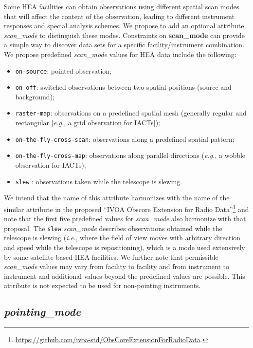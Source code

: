 \documentclass[11pt,a4paper]{ivoa}
\begin{document}
Some \gls{HEA} facilities can obtain observations using different spatial scan modes that will affect the content of the observation, leading to different instrument responses and special analysis schemes.  We propose to add an optional attribute {\em scan\_mode\/} to distinguish these modes.  Constraints on {\bf scan\_mode} can provide a simple way to discover data sets for a specific facility/instrument combination.  We propose predefined {\em scan\_mode\/} values for \gls{HEA} data include the following:
\begin{itemize}
	\item \texttt{on-source}: pointed observation;
	\item \texttt{on-off}: switched observations between two spatial positions (source and background);
	\item \texttt{raster-map}: observations on a predefined spatial mesh (generally regular and rectangular [{\em e.g.\/}, a grid observation for \glspl{IACT}]);
	\item \texttt{on-the-fly-cross-scan}: observations along a predefined spatial pattern;
	\item \texttt{on-the-fly-cross-map}: observations along parallel directions ({\em e.g.\/}, a wobble observation for \glspl{IACT});
	\item \texttt{slew} : observations taken while the telescope is slewing.
\end{itemize}
We intend that the name of this attribute harmonizes with the name of the similar attribute in the proposed ``IVOA Obscore Extension for Radio Data''\footnote{\url{https://github.com/ivoa-std/ObsCoreExtensionForRadioData}.} and note that the first five predefined values for {\em scan\_mode\/} also harmonize with that proposal.  The \texttt{slew} {\em scan\_mode\/} describes observations obtained while the telescope is slewing ({\em i.e.\/}, where the field of view moves with arbitrary direction and speed while the telescope is repositioning), which is a mode used extensively by some satellite-based \gls{HEA} facilities.  We further note that permissible {\em scan\_mode\/} values may vary from facility to facility and from instrument to instrument and additional values beyond the predefined values are possible. This attribute is not expected to be used for non-pointing instruments.


\subsection{{\em pointing\_mode}}
\end{document}
